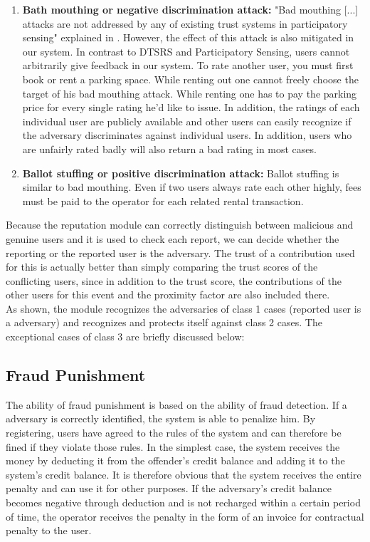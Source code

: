 \documentclass[
a4paper,     %
titlepage,   %
14pt         %
]{scrartcl}  %
\theoremstyle{mystyle}
\begin{document}
\begin{enumerate}
\item \textbf{Bath mouthing or negative discrimination attack:} "Bad mouthing [...] attacks are not addressed by any of existing trust systems in participatory sensing"  explained in \cite{mousa2015trust}. However, the effect of this attack is also mitigated in our system. In contrast to DTSRS and Participatory Sensing, users cannot arbitrarily give feedback in our system. To rate another user, you must first book or rent a parking space. While renting out one cannot freely choose the target of his bad mouthing attack. While renting one has to pay the parking price for every single rating he'd like to issue. In addition, the ratings of each individual user are publicly available and other users can easily recognize if the adversary discriminates against individual users. In addition, users who are unfairly rated badly will also return a bad rating in most cases.
\item \textbf{Ballot stuffing or positive discrimination attack:} Ballot stuffing is similar to bad mouthing. Even if two users always rate each other highly, fees must be paid to the operator for each related rental transaction.
\end{enumerate}

Because the reputation module can correctly distinguish between malicious and genuine users and it is used to check each report, we can decide whether the reporting or the reported user is the adversary. The trust of a contribution used for this is actually better than simply comparing the trust scores of the conflicting users, since in addition to the trust score, the contributions of the other users for this event and the proximity factor are also included there. \\

As shown, the module recognizes the adversaries of class 1 cases (reported user is a adversary) and recognizes and protects itself against class 2 cases. The exceptional cases of class 3 are briefly discussed below: 


\subsection{Fraud Punishment}
The ability of fraud punishment is based on the ability of fraud detection. If a adversary is correctly identified, the system is able to penalize him. By registering, users have agreed to the rules of the system and can therefore be fined if they violate those rules. In the simplest case, the system receives the money by deducting it from the offender's credit balance and adding it to the system's credit balance. It is therefore obvious that the system receives the entire penalty and can use it for other purposes. If the adversary's credit balance becomes negative through deduction and is not recharged within a certain period of time, the operator receives the penalty in the form of an invoice for contractual penalty to the user.
\end{document}
